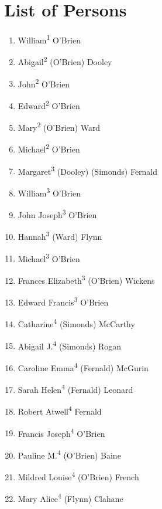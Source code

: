 \chapter{List of Persons}
\begin{enumerate}
	\item\label{per:William1OBrien}William\textsuperscript{1} O'Brien
	\item\label{per:Abigail2OBrien}Abigail\textsuperscript{2} (O'Brien) Dooley
	\item\label{per:John2OBrien}John\textsuperscript{2} O'Brien
	\item\label{per:Edward2OBrien}Edward\textsuperscript{2} O'Brien
	\item\label{per:Mary2OBrien}Mary\textsuperscript{2} (O'Brien) Ward
	\item\label{per:Michael2OBrien}Michael\textsuperscript{2} O'Brien
	\item\label{per:Margaret3Dooley}Margaret\textsuperscript{3} (Dooley) (Simonds) Fernald
	\item\label{per:William3OBrien}William\textsuperscript{3} O'Brien
	\item\label{per:John3OBrien}John Joseph\textsuperscript{3} O'Brien
	\item\label{per:Hannah3Ward}Hannah\textsuperscript{3} (Ward) Flynn
	\item\label{per:Michael3OBrien}Michael\textsuperscript{3} O'Brien
	\item\label{per:Frances3OBrien}Frances Elizabeth\textsuperscript{3} (O'Brien) Wickens
	\item\label{per:Edward3OBrien}Edward Francis\textsuperscript{3} O'Brien
	\item\label{per:Catharine4Simonds}Catharine\textsuperscript{4} (Simonds) McCarthy
	\item\label{per:Abigail4Simonds}Abigail J.\textsuperscript{4} (Simonds) Rogan
	\item\label{per:Caroline4Fernald}Caroline Emma\textsuperscript{4} (Fernald) McGurin
	\item\label{per:Sarah4Fernald}Sarah Helen\textsuperscript{4} (Fernald) Leonard
	\item\label{per:Robert4Fernald}Robert Atwell\textsuperscript{4} Fernald
	\item\label{per:Francis4OBrien}Francis Joseph\textsuperscript{4} O'Brien
	\item\label{per:Pauline4OBrien}Pauline M.\textsuperscript{4} (O'Brien) Baine
	\item\label{per:Mildred4OBrien}Mildred Louise\textsuperscript{4} (O'Brien) French
	\item\label{per:MaryAlice4Flynn}Mary Alice\textsuperscript{4} (Flynn) Clahane
\end{enumerate}

